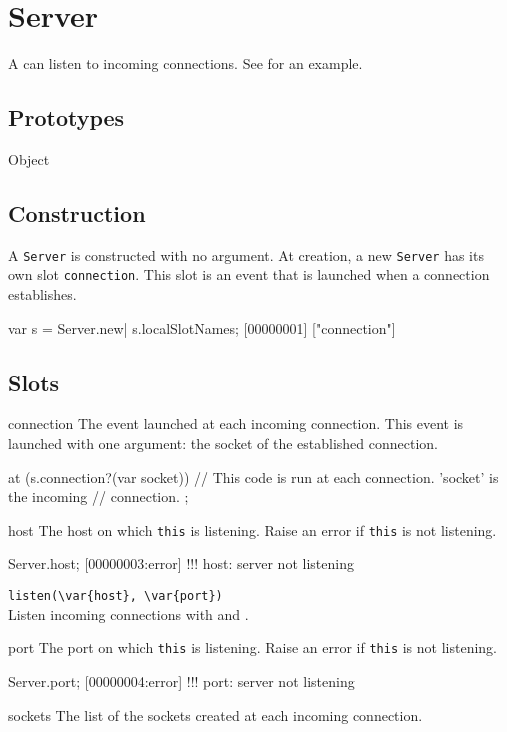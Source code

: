 \section{Server}

A  can listen to incoming connections.  See
 for an example.

\subsection{Prototypes}
\begin{refObjects}
\item[Object]
\end{refObjects}

\subsection{Construction}

A \lstinline|Server| is constructed with no argument. At creation, a
new \lstinline|Server| has its own slot \lstinline|connection|. This
slot is an event that is launched when a connection establishes.

\begin{urbiscript}
var s = Server.new|
s.localSlotNames;
[00000001] ["connection"]
\end{urbiscript}

\subsection{Slots}
\begin{urbiscriptapi}
\item[connection]
  The event launched at each incoming connection. This event is
  launched with one argument: the socket of the established connection.
\begin{urbiscript}
at (s.connection?(var socket))
{
  // This code is run at each connection. 'socket' is the incoming
  // connection.
};
\end{urbiscript}

\item[host]
  The host on which \lstinline|this| is listening. Raise an error if
  \lstinline|this| is not listening.
\begin{urbiscript}
Server.host;
[00000003:error] !!! host: server not listening
\end{urbiscript}

\item \lstinline|listen(\var{host}, \var{port})|\\
  Listen incoming connections with  and .

\item[port]
  The port on which \lstinline|this| is listening. Raise an error if
  \lstinline|this| is not listening.
\begin{urbiscript}
Server.port;
[00000004:error] !!! port: server not listening
\end{urbiscript}

\item[sockets]
  The list of the sockets created at each incoming connection.
\end{urbiscriptapi}

